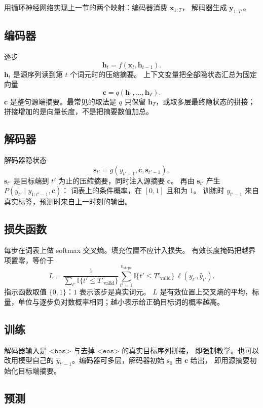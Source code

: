 用循环神经网络实现上一节的两个映射：编码器消费 $\bm{x}_{1:T}$，
解码器生成 $\bm{y}_{1:T'}$。

\subsection{编码器}

逐步
\[
\bm{h}_t=f(\bm{x}_t,\bm{h}_{t-1}).
\]
$\bm{h}_t$ 是源序列读到第 $t$ 个词元时的压缩摘要。
上下文变量把全部隐状态汇总为固定向量
\[
\bm{c}=q(\bm{h}_1,\ldots,\bm{h}_T).
\]
$\bm{c}$ 是整句源端摘要。最常见的取法是 $q$ 只保留 $\bm{h}_T$，或取多层最终隐状态的拼接；
拼接增加的是向量长度，不是把摘要数值加总。

\subsection{解码器}

解码器隐状态
\[
\bm{s}_{t'}=g(y_{t'-1},\bm{c},\bm{s}_{t'-1}),
\]
$\bm{s}_{t'}$ 是目标端到 $t'$ 为止的压缩摘要，同时注入源摘要 $\bm{c}$。
再由 $\bm{s}_{t'}$ 产生 $P(y_{t'}\mid y_{1:t'-1},\bm{c})$：
词表上的条件概率，在 $[0,1]$ 且和为 $1$。
训练时 $y_{t'-1}$ 来自真实标签，预测时来自上一时刻的输出。

\subsection{损失函数}

每步在词表上做 softmax 交叉熵。填充位置不应计入损失。
有效长度掩码把越界项置零，等价于
\[
L
=
\frac{1}{\sum_{t'}\mathbb{I}\{t'\le T'_{\text{valid}}\}}
\sum_{t'=1}^{n_{\text{steps}}}
\mathbb{I}\{t'\le T'_{\text{valid}}\}\,
\ell(y_{t'},\hat{y}_{t'}).
\]
指示函数取值 $\{0,1\}$：$1$ 表示该步是真实词元。
$L$ 是有效位置上交叉熵的平均，标量，单位与逐步负对数概率相同；越小表示给正确目标词的概率越高。

\subsection{训练}

解码器输入是 $\texttt{<bos>}$ 与去掉 $\texttt{<eos>}$ 的真实目标序列拼接，
即强制教学。也可以改用模型自己的 $\hat{y}_{t'-1}$。编码器可多层，解码器初始 $\bm{s}_0$ 由 $\bm{c}$ 给出，
即用源摘要初始化目标端摘要。

\subsection{预测}

